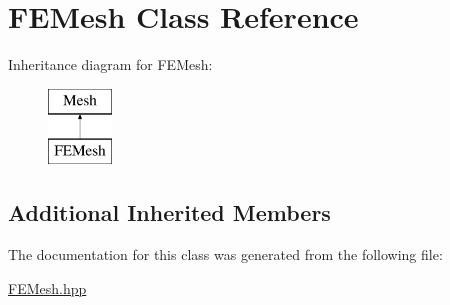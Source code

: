 \hypertarget{class_f_e_mesh}{}\section{F\+E\+Mesh Class Reference}
\label{class_f_e_mesh}
Inheritance diagram for F\+E\+Mesh\+:\begin{figure}[H]
\begin{center}
\leavevmode
\includegraphics[height=2.000000cm]{class_f_e_mesh}
\end{center}
\end{figure}
\subsection*{Additional Inherited Members}


The documentation for this class was generated from the following file\+:\begin{DoxyCompactItemize}
\item 
\mbox{\hyperlink{_f_e_mesh_8hpp}{F\+E\+Mesh.\+hpp}}\end{DoxyCompactItemize}
